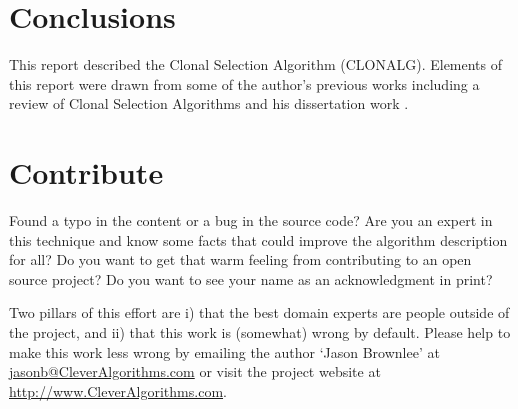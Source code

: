 \documentclass[a4paper, 11pt]{article}
\makeatletter
\newcommand{\myreportauthor}{Jason Brownlee}
\newcommand{\myreportemail}{jasonb@CleverAlgorithms.com}
\newcommand{\myreportwebsite}{http://www.CleverAlgorithms.com}
\makeatother
\begin{document}
% 
% 
\section{Conclusions}
\label{sec:conclusions}
This report described the Clonal Selection Algorithm (CLONALG).
Elements of this report were drawn from some of the author's previous works including a review of Clonal Selection Algorithms \cite{Brownlee2007b} and his dissertation work \cite{Brownlee2008}.

% 
% 
\section{Contribute}
\label{sec:contribute}
Found a typo in the content or a bug in the source code? 
Are you an expert in this technique and know some facts that could improve the algorithm description for all?
Do you want to get that warm feeling from contributing to an open source project? 
Do you want to see your name as an acknowledgment in print?

Two pillars of this effort are i) that the best domain experts are people outside of the project, and ii) that this work is (somewhat) wrong by default. 
Please help to make this work less wrong by emailing the author `\myreportauthor' at \url{\myreportemail} or visit the project website at \url{\myreportwebsite}.



\end{document}
